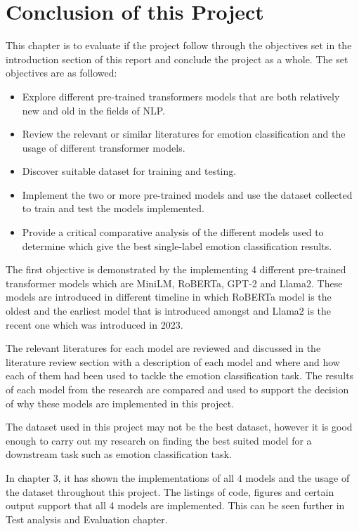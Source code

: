 
\chapter{Conclusion of this Project}

This chapter is to evaluate if the project follow through the objectives set in the introduction section of this report and conclude the project as a whole. The set objectives are as followed:

\begin{itemize}
    \item Explore different pre-trained transformers models that are both relatively new and old in the fields of NLP.
    \item Review the relevant or similar literatures for emotion classification and the usage of different transformer models.
    \item Discover suitable dataset for training and testing.
    \item Implement the two or more pre-trained models and use the dataset collected to train and test the models implemented.
    \item Provide a critical comparative analysis of the different models used to determine which give the best single-label emotion classification results.
\end{itemize}

The first objective is demonstrated by the implementing 4 different pre-trained transformer models which are MiniLM, RoBERTa, GPT-2 and Llama2. These models are introduced in different timeline in which RoBERTa model is the oldest and the earliest model that is introduced amongst and Llama2 is the recent one which was introduced in 2023.

The relevant literatures for each model are reviewed and discussed in the literature review section with a description of each model and where and how each of them had been used to tackle the emotion classification task. The results of each model from the research are compared and used to support the decision of why these models are implemented in this project.

The dataset used in this project may not be the best dataset, however it is good enough to carry out my research on finding the best suited model for a downstream task such as emotion classification task.

In chapter 3, it has shown the implementations of all 4 models and the usage of the dataset throughout this project. The listings of code, figures and certain output support that all 4 models are implemented. This can be seen further in Test analysis and Evaluation chapter.

